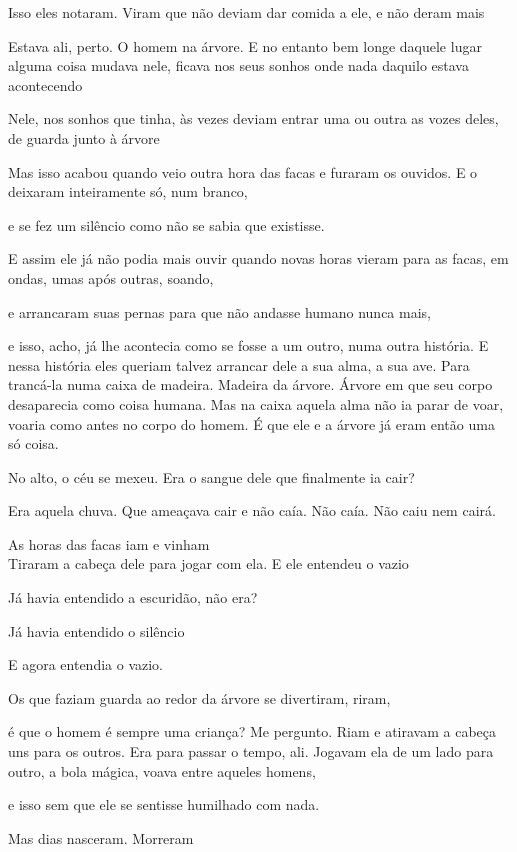 Isso eles notaram. Viram que não deviam dar comida a ele, e não deram
mais

Estava ali, perto. O homem na árvore. E no entanto bem longe daquele
lugar alguma coisa mudava nele, ficava nos seus sonhos onde nada daquilo
estava acontecendo

Nele, nos sonhos que tinha, às vezes deviam entrar uma ou outra as vozes
deles, de guarda junto à árvore

Mas isso acabou quando veio outra hora das facas e furaram os ouvidos. E
o deixaram inteiramente só, num branco,

e se fez um silêncio como não se sabia que existisse.

E assim ele já não podia mais ouvir quando novas horas vieram para as
facas, em ondas, umas após outras, soando,

e arrancaram suas pernas para que não andasse humano nunca mais,

e isso, acho, já lhe acontecia como se fosse a um outro, numa outra
história. E nessa história eles queriam talvez arrancar dele a sua alma,
a sua ave. Para trancá-la numa caixa de madeira. Madeira da árvore.
Árvore em que seu corpo desaparecia como coisa humana. Mas na caixa
aquela alma não ia parar de voar, voaria como antes no corpo do homem. É
que ele e a árvore já eram então uma só coisa.

No alto, o céu se mexeu. Era o sangue dele que finalmente ia cair?

Era aquela chuva. Que ameaçava cair e não caía. Não caía. Não caiu nem
cairá.

As horas das facas iam e vinham\\

Tiraram a cabeça dele para jogar com ela. E ele entendeu o vazio

Já havia entendido a escuridão, não era?

Já havia entendido o silêncio

E agora entendia o vazio.

Os que faziam guarda ao redor da árvore se divertiram, riram,

é que o homem é sempre uma criança? Me pergunto. Riam e atiravam a
cabeça uns para os outros. Era para passar o tempo, ali. Jogavam ela de
um lado para outro, a bola mágica, voava entre aqueles homens,

e isso sem que ele se sentisse humilhado com nada.

Mas dias nasceram. Morreram\\

